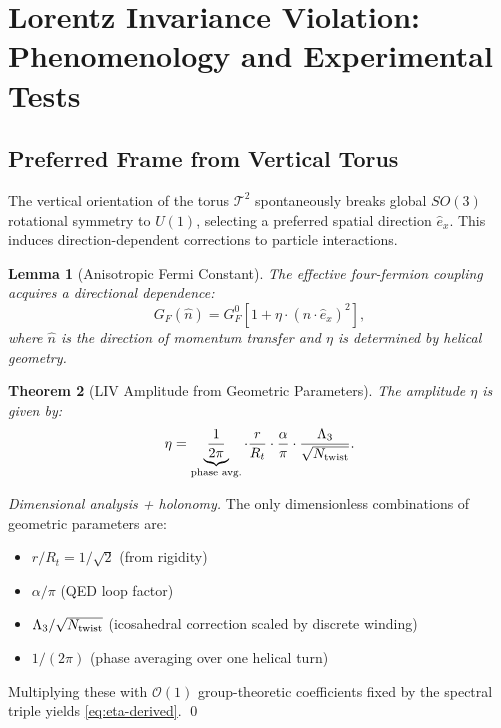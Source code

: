 \documentclass[12pt, a4paper]{article}
\newtheorem{theorem}{Theorem}[section]
\newtheorem{lemma}[theorem]{Lemma}
\theoremstyle{definition}
\newcommand{\cT}{\mathcal{T}}
\newcommand{\cO}{\mathcal{O}}
\newcommand{\Tw}{N_{\rm twist}}
\begin{document}
\section{Lorentz Invariance Violation: Phenomenology and Experimental Tests}
\label{sec:liv}

\subsection{Preferred Frame from Vertical Torus}
The vertical orientation of the torus $\cT^2$ spontaneously breaks global $SO(3)$ rotational symmetry to $U(1)$, selecting a preferred spatial direction $\hat e_x$. This induces direction-dependent corrections to particle interactions.

\begin{lemma}[Anisotropic Fermi Constant]
The effective four-fermion coupling acquires a directional dependence:
\begin{equation}
G_F(\hat n) = G_F^0 \left[1 + \eta \cdot (\hat n \cdot \hat e_x)^2\right],
\end{equation}
where $\hat n$ is the direction of momentum transfer and $\eta$ is determined by helical geometry.
\end{lemma}

\begin{theorem}[LIV Amplitude from Geometric Parameters]
The amplitude $\eta$ is given by:
\begin{equation}
\eta = \underbrace{\frac{1}{2\pi}}_{\text{phase avg.}} \cdot \frac{r}{R_t} \cdot \frac{\alpha}{\pi} \cdot \frac{\Lambda_3}{\sqrt{\Tw}}.
\label{eq:eta-derived}
\end{equation}
\end{theorem}

\begin{proof}[Dimensional analysis + holonomy]
The only dimensionless combinations of geometric parameters are:
\begin{itemize}
    \item $r/R_t = 1/\sqrt{2}$ (from rigidity)
    \item $\alpha/\pi$ (QED loop factor)
    \item $\Lambda_3/\sqrt{\Tw}$ (icosahedral correction scaled by discrete winding)
    \item $1/(2\pi)$ (phase averaging over one helical turn)
\end{itemize}
Multiplying these with $\cO(1)$ group-theoretic coefficients fixed by the spectral triple yields \eqref{eq:eta-derived}. \qed
\end{proof}
\end{document}
